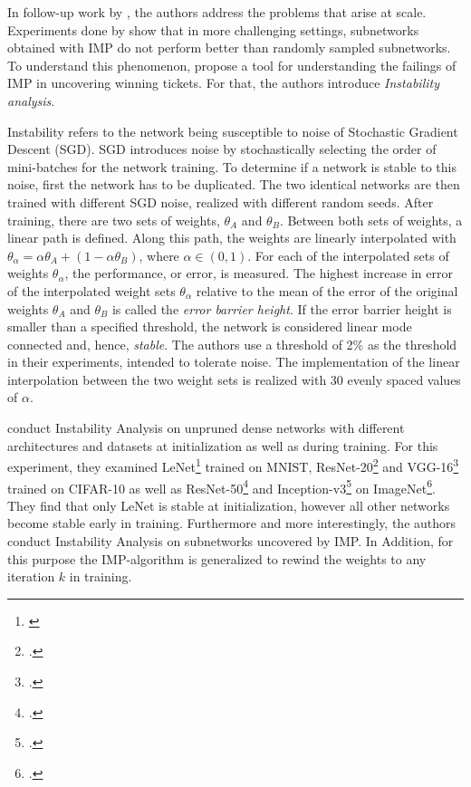 In follow-up work by \textcite{LinearModeConnectivity}, the authors address the problems that arise at scale. Experiments done by \textcite{Liu19, Gale19} show that in more challenging settings, subnetworks obtained with IMP do not perform better than randomly sampled subnetworks. To understand this phenomenon, \textcite{LinearModeConnectivity} propose a tool for understanding the failings of IMP in uncovering winning tickets. For that, the authors introduce \textit{Instability analysis}.

Instability refers to the network being susceptible to noise of Stochastic Gradient Descent (SGD).
SGD introduces noise by stochastically selecting the order of mini-batches for the network training.
To determine if a network is stable to this noise, first the network has to be duplicated.
The two identical networks are then trained with different SGD noise, realized with different random seeds.
After training, there are two sets of weights, $\theta_A$ and $\theta_B$.
Between both sets of weights, a linear path is defined. Along this path, the weights are linearly interpolated with $\theta_\alpha = \alpha \theta_A + (1 - \alpha \theta_B)$, where $\alpha \in (0,1)$. 
For each of the interpolated sets of weights $\theta_\alpha$, the performance, or error, is measured.
The highest increase in error of the interpolated weight sets $\theta_\alpha$ relative to the mean of the error of the original weights $\theta_A$ and $\theta_B$ is called the \textit{error barrier height}. 
If the error barrier height is smaller than a specified threshold, the network is considered linear mode connected and, hence, \textit{stable}.
The authors use a threshold of 2\% as the threshold in their experiments, intended to tolerate noise. The implementation of the linear interpolation between the two weight sets is realized with 30 evenly spaced values of $\alpha$.

\textcite{LinearModeConnectivity} conduct Instability Analysis on unpruned dense networks with different architectures and datasets at initialization as well as during training. For this experiment, they examined LeNet\footnote{\cite{cnn}} trained on MNIST, ResNet-20\footcite{ResidualConnect} and VGG-16\footcite{SimonyanZisserman} trained on CIFAR-10 as well as ResNet-50\footcite{ResidualConnect} and Inception-v3\footcite{inceptionv3} on ImageNet\footcite{imagenet}. They find that only LeNet is stable at initialization, however all other networks become stable early in training.
Furthermore and more interestingly, the authors conduct Instability Analysis on subnetworks uncovered by IMP.
In Addition, for this purpose the IMP-algorithm is generalized to rewind the weights to any iteration $k$ in training.

